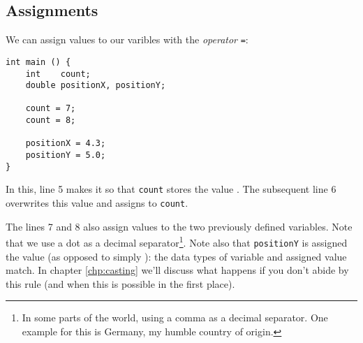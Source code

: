 \subsection{Assignments} \label{sec:valueAssignment}
We can assign values to our varibles with the \emph{operator} \texttt{=}:
\begin{codebox}[assignments.c]
\begin{verbatim}
int main () {
    int    count;
    double positionX, positionY;

    count = 7;
    count = 8;

    positionX = 4.3;
    positionY = 5.0;
}
\end{verbatim}
 \label{code:simpleAssignment}
\end{codebox}

In this, line 5 makes it so that \texttt{count} stores the value . The subsequent line 6 overwrites this value and assigns  to \texttt{count}.

The lines 7 and 8 also assign values to the two previously defined  variables. Note that we use a dot as a decimal separator\footnote{In some parts of the world, using a comma as a decimal separator. One example for this is Germany, my humble country of origin.}. Note also that \texttt{positionY} is assigned the value  (as opposed to simply ): the data types of variable and assigned value match. In chapter \ref{chp:casting} we'll discuss what happens if you don't abide by this rule (and when this is possible in the first place).


